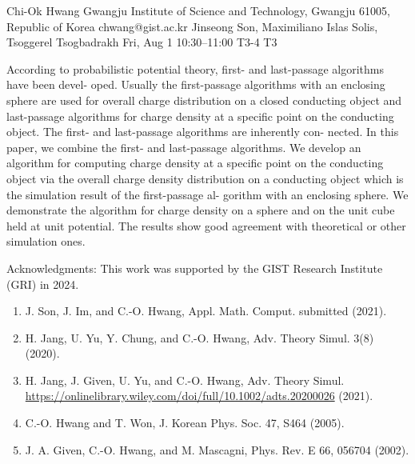 \documentclass[12pt,lettersize,oneside]{book} %
\begin{document}
\begin{talk}
  {Chi-Ok Hwang}%
  {Gwangju Institute of Science and Technology, Gwangju 61005, Republic of Korea}%
  {chwang@gist.ac.kr}%
  {Jinseong Son, Maximiliano Islas Solis, Tsoggerel Tsogbadrakh}%
  {}%
  {}%
  {Fri, Aug 1 10:30--11:00}%
  {T3-4}%
  {T3}%
  
    
   
According to probabilistic potential theory, first- and last-passage algorithms have been devel-
oped. Usually the first-passage algorithms with an enclosing sphere are used for overall charge
distribution on a closed conducting object and last-passage algorithms for charge density at a
specific point on the conducting object. The first- and last-passage algorithms are inherently con-
nected. In this paper, we combine the first- and last-passage algorithms. We develop an algorithm
for computing charge density at a specific point on the conducting object via the overall charge
density distribution on a conducting object which is the simulation result of the first-passage al-
gorithm with an enclosing sphere. We demonstrate the algorithm for charge density on a sphere
and on the unit cube held at unit potential. The results show good agreement with theoretical or
other simulation ones.


\medskip

Acknowledgments: This work was supported by the GIST Research Institute (GRI) in 2024.
\begin{enumerate}
 \item[{[1]}] J. Son, J. Im, and C.-O. Hwang, Appl. Math. Comput. submitted (2021).
 \item[{[2]}] H. Jang, U. Yu, Y. Chung, and C.-O. Hwang, Adv. Theory Simul. 3(8) (2020).
  \item[{[3]}] H. Jang, J. Given, U. Yu, and C.-O. Hwang, Adv. Theory Simul.\hfill\break
   \href{https://onlinelibrary.wiley.com/doi/full/10.1002/adts.202000268}{https://onlinelibrary.wiley.com/doi/full/10.1002/adts.20200026} (2021).
 \item[{[4]}] C.-O. Hwang and T. Won, J. Korean Phys. Soc. 47, S464 (2005).
 \item[{[5]}] J. A. Given, C.-O. Hwang, and M. Mascagni, Phys. Rev. E 66, 056704 (2002).
\end{enumerate}


\end{talk}
\end{document}
